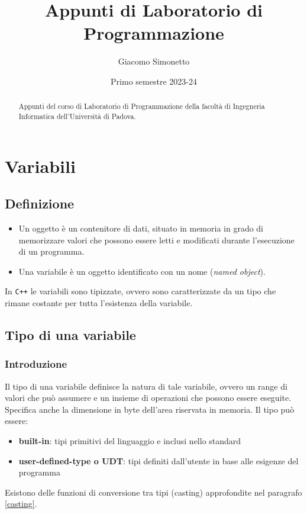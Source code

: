 \documentclass[a4paper]{article}
\title{Appunti di Laboratorio di Programmazione}
\author{Giacomo Simonetto}
\date{Primo semestre 2023-24}
\newcommand{\cpp}{\texttt{C++} } %
\begin{document}
\maketitle
\begin{abstract}
	Appunti del corso di Laboratorio di Programmazione della facoltà di Ingegneria Informatica dell'Università di Padova.
\end{abstract}

\vspace{12em}
\begin{center}
	\large \textbf{}
\end{center}

\newpage

\tableofcontents

\newpage




\section{Variabili}
\subsection*{Definizione}
\begin{itemize}
	\item Un oggetto è un contenitore di dati, situato in memoria in grado di memorizzare valori che possono	essere letti e
	modificati durante l'esecuzione di un programma.
	\item Una variabile è un oggetto identificato con un nome (\textit{named object}).
\end{itemize}
In \cpp le variabili sono tipizzate, ovvero sono caratterizzate  da un tipo che rimane costante per tutta l'esistenza della
variabile.

\subsection{Tipo di una variabile}
\subsubsection*{Introduzione}
Il tipo di una variabile definisce la natura di tale variabile, ovvero un range di valori che può assumere e un insieme di
operazioni che possono essere eseguite. Specifica anche la dimensione in byte dell'area riservata in memoria. Il tipo può
essere:
\begin{itemize}
	\item \textbf{built-in}: tipi primitivi del linguaggio e inclusi nello standard
	\item \textbf{user-defined-type o UDT}: tipi definiti dall'utente in base alle esigenze del programma
\end{itemize}
Esistono delle funzioni di conversione tra tipi (casting) approfondite nel paragrafo \ref{casting}.
\end{document}
